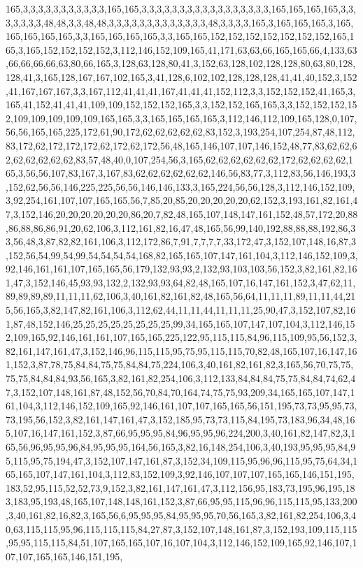 165,3,3,3,3,3,3,3,3,3,3,3,165,165,3,3,3,3,3,3,3,3,3,3,3,3,3,3,3,3,3,165,165,165,165,3,3,3,3,3,3,3,48,48,3,3,48,48,3,3,3,3,3,3,3,3,3,3,3,3,3,48,3,3,3,3,165,3,165,165,165,3,165,165,165,165,165,3,3,165,165,165,165,3,3,165,165,152,152,152,152,152,152,152,165,165,3,165,152,152,152,152,3,112,146,152,109,165,41,171,63,63,66,165,165,66,4,133,63,66,66,66,66,63,80,66,165,3,128,63,128,80,41,3,152,63,128,102,128,128,80,63,80,128,128,41,3,165,128,167,167,102,165,3,41,128,6,102,102,128,128,128,41,41,40,152,3,152,41,167,167,167,3,3,167,112,41,41,41,167,41,41,41,152,112,3,3,152,152,152,41,165,3,165,41,152,41,41,41,109,109,152,152,152,165,3,3,152,152,165,165,3,3,152,152,152,152,109,109,109,109,109,165,165,3,3,165,165,165,165,3,112,146,112,109,165,128,0,107,56,56,165,165,225,172,61,90,172,62,62,62,62,62,83,152,3,193,254,107,254,87,48,112,83,172,62,172,172,172,62,172,62,172,56,48,165,146,107,107,146,152,48,77,83,62,62,62,62,62,62,62,62,83,57,48,40,0,107,254,56,3,165,62,62,62,62,62,62,172,62,62,62,62,165,3,56,56,107,83,167,3,167,83,62,62,62,62,62,62,146,56,83,77,3,112,83,56,146,193,3,152,62,56,56,146,225,225,56,56,146,146,133,3,165,224,56,56,128,3,112,146,152,109,3,92,254,161,107,107,165,165,56,7,85,20,85,20,20,20,20,20,62,152,3,193,161,82,161,47,3,152,146,20,20,20,20,20,20,86,20,7,82,48,165,107,148,147,161,152,48,57,172,20,88,86,88,86,86,91,20,62,106,3,112,161,82,16,47,48,165,56,99,140,192,88,88,88,192,86,33,56,48,3,87,82,82,161,106,3,112,172,86,7,91,7,7,7,7,33,172,47,3,152,107,148,16,87,3,152,56,54,99,54,99,54,54,54,54,168,82,165,165,107,147,161,104,3,112,146,152,109,3,92,146,161,161,107,165,165,56,179,132,93,93,2,132,93,103,103,56,152,3,82,161,82,161,47,3,152,146,45,93,93,132,2,132,93,93,64,82,48,165,107,16,147,161,152,3,47,62,11,89,89,89,89,11,11,11,62,106,3,40,161,82,161,82,48,165,56,64,11,11,11,89,11,11,44,215,56,165,3,82,147,82,161,106,3,112,62,44,11,11,44,11,11,11,25,90,47,3,152,107,82,161,87,48,152,146,25,25,25,25,25,25,25,25,99,34,165,165,107,147,107,104,3,112,146,152,109,165,92,146,161,161,107,165,165,225,122,95,115,115,84,96,115,109,95,56,152,3,82,161,147,161,47,3,152,146,96,115,115,95,75,95,115,115,70,82,48,165,107,16,147,161,152,3,87,78,75,84,84,75,75,84,84,75,224,106,3,40,161,82,161,82,3,165,56,70,75,75,75,75,84,84,84,93,56,165,3,82,161,82,254,106,3,112,133,84,84,84,75,75,84,84,74,62,47,3,152,107,148,161,87,48,152,56,70,84,70,164,74,75,75,93,209,34,165,165,107,147,161,104,3,112,146,152,109,165,92,146,161,107,107,165,165,56,151,195,73,73,95,95,73,73,195,56,152,3,82,161,147,161,47,3,152,185,95,73,73,115,84,195,73,183,96,34,48,165,107,16,147,161,152,3,87,66,95,95,95,84,96,95,95,96,224,200,3,40,161,82,147,82,3,165,56,96,95,95,96,84,95,95,95,164,56,165,3,82,16,148,254,106,3,40,193,95,95,95,84,95,115,95,75,194,47,3,152,107,147,161,87,3,152,34,109,115,95,96,96,115,95,75,64,34,165,165,107,147,161,104,3,112,83,152,109,3,92,146,107,107,107,165,165,146,151,195,183,52,95,115,52,52,73,9,152,3,82,161,147,161,47,3,112,156,95,183,73,195,96,195,183,183,95,193,48,165,107,148,148,161,152,3,87,66,95,95,115,96,96,115,115,95,133,200,3,40,161,82,16,82,3,165,56,6,95,95,95,84,95,95,95,70,56,165,3,82,161,82,254,106,3,40,63,115,115,95,96,115,115,115,84,27,87,3,152,107,148,161,87,3,152,193,109,115,115,95,95,115,115,84,51,107,165,165,107,16,107,104,3,112,146,152,109,165,92,146,107,107,107,165,165,146,151,195,